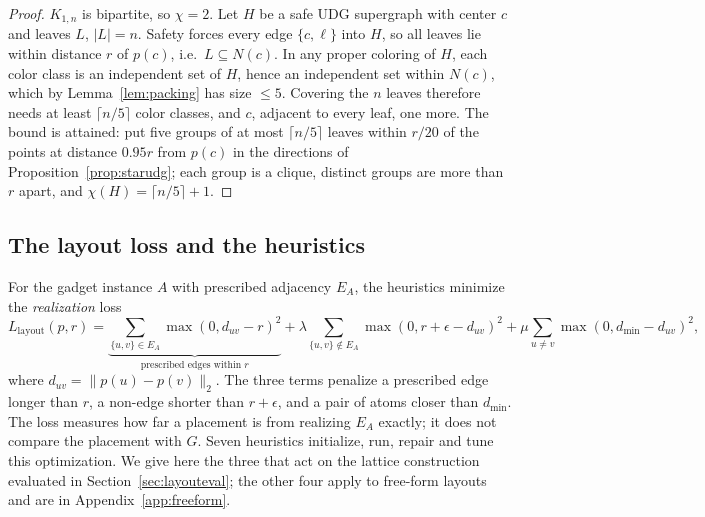 \documentclass[a4paper,fleqn]{cas-sc}
\begin{document}
\begin{proof}
$K_{1,n}$ is bipartite, so $\chi=2$. Let $H$ be a safe UDG supergraph with center
$c$ and leaves $L$, $|L|=n$. Safety forces every edge $\{c,\ell\}$ into $H$, so all
leaves lie within distance $r$ of $p(c)$, i.e.\ $L\subseteq N(c)$. In any proper
coloring of $H$, each color class is an independent set of $H$, hence an
independent set within $N(c)$, which by Lemma~\ref{lem:packing} has size $\le 5$.
Covering the $n$ leaves therefore needs at least $\lceil n/5\rceil$ color classes,
and $c$, adjacent to every leaf, one more. The bound is attained: put five groups of
at most $\lceil n/5\rceil$ leaves within $r/20$ of the points at distance $0.95r$
from $p(c)$ in the directions of Proposition~\ref{prop:starudg}; each group is a
clique, distinct groups are more than $r$ apart, and $\chi(H)=\lceil n/5\rceil+1$.
\end{proof}

\subsection{The layout loss and the heuristics}
\label{sec:seven}

For the gadget instance $A$ with prescribed adjacency $E_A$, the heuristics minimize
the \emph{realization} loss
\begin{equation}
\label{eq:layoutloss}
  L_{\mathrm{layout}}(p,r) =
  \underbrace{\sum_{\{u,v\}\in E_A}\!\!\max(0,d_{uv}-r)^2}_{\text{prescribed edges within }r}
  + \lambda\!\!\sum_{\{u,v\}\notin E_A}\!\!\max(0,r+\epsilon-d_{uv})^2
  + \mu\!\sum_{u\ne v}\max(0,d_{\min}-d_{uv})^2,
\end{equation}
where $d_{uv}=\|p(u)-p(v)\|_2$. The three terms penalize a prescribed edge longer
than $r$, a non-edge shorter than $r+\epsilon$, and a pair of atoms closer than
$d_{\min}$. The loss measures how far a placement is from realizing $E_A$ exactly; it
does not compare the placement with $G$. Seven heuristics initialize, run, repair
and tune this optimization. We give here the three that act on the lattice
construction evaluated in Section~\ref{sec:layouteval}; the other four apply to
free-form layouts and are in Appendix~\ref{app:freeform}.
\end{document}
